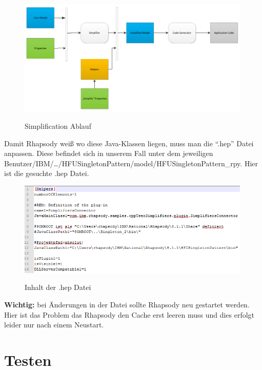 \begin{figure}[!htbp]
	\centering
	\includegraphics[width=0.99\textwidth]{content/pictures/simplifier.png}
	\label{pic:bild}
	\caption{Simplification Ablauf \cite{oldDoku}}
\end{figure}

Damit Rhapsody weiß wo diese Java-Klassen liegen, muss man die \enquote{.hep} Datei
anpassen. Diese befindet sich in unserem Fall unter dem jeweiligen
Benutzer/IBM/\ldots/HFUSingletonPattern/model/HFUSingletonPattern_rpy. Hier ist
die gesuchte .hep Datei.
 
\begin{figure}[!htbp]
	\centering
	\includegraphics[width=0.99\textwidth]{content/pictures/hep.png}
	\label{pic:bild}
	\caption{Inhalt der .hep Datei}
\end{figure} 

\textbf{Wichtig:} bei Änderungen in der Datei sollte Rhapsody neu gestartet
werden. Hier ist das Problem das Rhapsody den Cache erst leeren muss und dies
erfolgt leider nur nach einem Neustart. 
\section{Testen}

